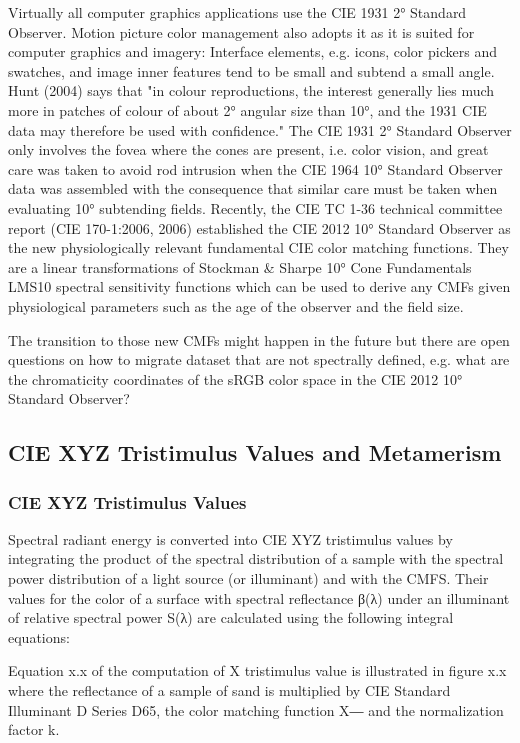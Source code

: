 Virtually all computer graphics applications use the CIE 1931 2° Standard Observer. Motion picture color management also adopts it as it is suited for computer graphics and imagery:
Interface elements, e.g. icons, color pickers and swatches, and image inner features tend to be small and subtend a small angle. Hunt (2004) says that "in colour reproductions, the interest generally lies much more in patches of colour of about 2° angular size than 10°, and the 1931 CIE data may therefore be used with confidence."
The CIE 1931 2° Standard Observer only involves the fovea where the cones are present, i.e. color vision, and great care was taken to avoid rod intrusion when the CIE 1964 10° Standard Observer data was assembled with the consequence that similar care must be taken when evaluating 10° subtending fields.
Recently, the CIE TC 1-36 technical committee report (CIE 170-1:2006, 2006) established the CIE 2012 10° Standard Observer as the new physiologically relevant fundamental CIE color matching functions. They are a linear transformations of Stockman & Sharpe 10° Cone Fundamentals LMS10 spectral sensitivity functions which can be used to derive any CMFs given physiological parameters such as the age of the observer and the field size.

The transition to those new CMFs might happen in the future but there are open questions on how to migrate dataset that are not spectrally defined, e.g. what are the chromaticity coordinates of the sRGB color space in the CIE 2012 10° Standard Observer?

\subsection{CIE XYZ Tristimulus Values and Metamerism}

\subsubsection{CIE XYZ Tristimulus Values}

Spectral radiant energy is converted into CIE XYZ tristimulus values by integrating the product of the spectral distribution of a sample with the spectral power distribution of a light source (or illuminant) and with the CMFS. Their values for the color of a surface with spectral reflectance β(λ) under an illuminant of relative spectral power S(λ) are calculated using the following integral equations:


Equation x.x of the computation of X tristimulus value is illustrated in figure x.x where the reflectance of a sample of sand is multiplied by CIE Standard Illuminant D Series D65, the color matching function X― and the normalization factor k.

